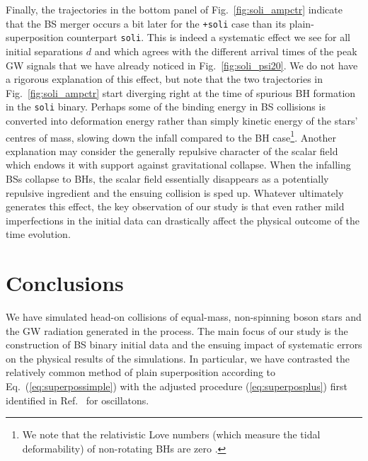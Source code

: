 \documentclass[]{iopart}
\newcommand{\us}[1]{\textcolor{teal}{[{\it\textbf{US: #1}}]} }
\renewcommand{\mr}[1]{\textcolor{purple}{[{\it\textbf{MR: #1}}]} }
\newcommand{\el}[1]{\textcolor{brown}{[{\it\textbf{EL: #1}}]} }
\begin{document}
Finally, the trajectories in the bottom panel of
Fig.~\ref{fig:soli_ampctr} indicate that the BS merger occurs a bit later
for the {\tt +soli} case than its plain-superposition counterpart
{\tt soli}. This is indeed a systematic effect we see for all
initial separations $d$ and which agrees with the different arrival
times of the peak GW signals that we have already noticed in
Fig.~\ref{fig:soli_psi20}. We do not have a rigorous explanation
of this effect, but note that the two trajectories in
Fig.~\ref{fig:soli_ampctr} start diverging right at the time of
spurious BH formation in the {\tt soli} binary. Perhaps some of the
binding energy in BS collisions is converted into deformation 
energy rather than simply kinetic energy of the stars' centres of mass,
slowing down the infall compared to the BH
case\footnote{We note that the relativistic Love numbers
(which measure the tidal deformability)
of non-rotating BHs are zero
\cite{Binnington:2009bb}.}.
Another explanation
may consider the generally repulsive character of the scalar field
which endows it with support against gravitational collapse. When the
infalling BSs collapse to BHs, the scalar field essentially disappears
as a potentially repulsive ingredient and the ensuing collision
is sped up. Whatever ultimately generates this effect, the key
observation of our study is that even rather mild imperfections in the initial
data can drastically affect the physical outcome of the time evolution.



\section{Conclusions}
\label{sec:conclusions}
%
We have simulated head-on collisions of equal-mass,
non-spinning boson stars and the GW radiation generated in the process.
The main focus of our study is the construction of BS binary initial
data and the ensuing impact of systematic errors on the physical
results of the simulations. In particular, we have contrasted the
relatively common method of
plain superposition according to Eq.~(\ref{eq:superpossimple}) with
the adjusted procedure (\ref{eq:superposplus})
first identified in Ref.~\cite{Helfer:2018vtq} for oscillatons.
\end{document}
